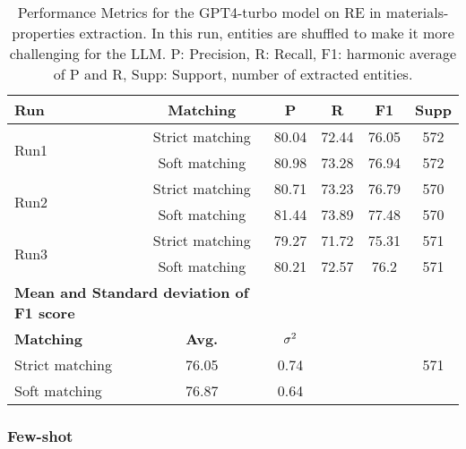 \begin{table}[htbp]
    \small
    \centering
    \caption{Performance Metrics for the GPT4-turbo model on RE in materials-properties extraction. In this run, entities are shuffled to make it more challenging for the LLM. P: Precision, R: Recall, F1: harmonic average of P and R, Supp: Support, number of extracted entities.}
    \begin{tabular}{lccccc}
        \toprule
        \textbf{Run} & \textbf{Matching} & \textbf{P} & \textbf{R} & \textbf{F1} & \textbf{Supp} \\
        \midrule
        \multirow{2}{*}{Run1} & Strict matching & 80.04 & 72.44 & 76.05 & 572 \\
        & Soft matching & 80.98 & 73.28 & 76.94 & 572 \\
        \midrule
        \multirow{2}{*}{Run2} & Strict matching & 80.71 & 73.23 & 76.79 & 570 \\
        & Soft matching & 81.44 & 73.89 & 77.48 & 570 \\
        \midrule
        \multirow{2}{*}{Run3} & Strict matching & 79.27 & 71.72 & 75.31 & 571 \\
        & Soft matching & 80.21 & 72.57 & 76.2 & 571 \\
        \midrule
        \multicolumn{2}{l}{\textbf{Mean and Standard deviation of F1 score}} & & & & \\
        \midrule
        \textbf{Matching} & \textbf{Avg.} & $\sigma\textsuperscript{2}$ & & & \\
        Strict matching & 76.05 & 0.74 & & & 571 \\
        Soft matching & 76.87 & 0.64 & & & \\
        \bottomrule
    \end{tabular}
\end{table}


\clearpage
\subsubsection{Few-shot}


